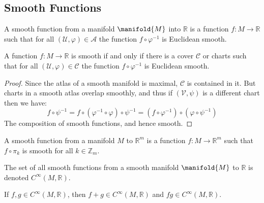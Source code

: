     \subsection{Smooth Functions}
        \begin{definition}
            A smooth function from a manifold $\manifold{M}$ into
            $\mathbb{R}$ is a function $f:M\rightarrow\mathbb{R}$ such that
            for all $(\mathcal{U},\varphi)\in\mathcal{A}$ the function
            $f\circ\varphi^{\minus{1}}$ is Euclidean smooth.
        \end{definition}
        \begin{theorem}
            A function $f:M\rightarrow\mathbb{R}$ is smooth if and only if
            there is a cover $\mathcal{C}$ or charts such that for all
            $(\mathcal{U},\varphi)\in\mathcal{C}$ the function
            $f\circ\varphi^{\minus{1}}$ is Euclidean smooth.
        \end{theorem}
        \begin{proof}
            Since the atlas of a smooth manifold is maximal, $\mathcal{C}$
            is contained in it. But charts in a smooth atlas overlap
            smoothly, and thus if $(\mathcal{V},\psi)$ is a different chart
            then we have:
            \begin{equation}
                f\circ\psi^{\minus{1}}
                    =f\circ(\varphi^{\minus{1}}\circ\varphi)
                        \circ\psi^{\minus{1}}
                    =(f\circ\varphi^{\minus{1}})
                        \circ(\varphi\circ\psi^{\minus{1}})
            \end{equation}
            The composition of smooth functions, and hence smooth.
        \end{proof}
        \begin{definition}
            A smooth function from a manifold $M$ to $\mathbb{R}^{m}$ is a
            function $f:M\rightarrow\mathbb{R}^{m}$ such that
            $f\circ\pi_{k}$ is smooth for all $k\in\mathbb{Z}_{m}$.
        \end{definition}
        \begin{definition}
            The set of all smooth functions from a smooth manifold
            $\manifold{M}$ to $\mathbb{R}$ is denoted
            $C^{\infty}(M,\mathbb{R})$.
        \end{definition}
        \begin{theorem}
            If $f,g\in{C}^{\infty}(M,\mathbb{R})$, then
            $f+g\in{C}^{\infty}(M,\mathbb{R})$ and
            $fg\in{C}^{\infty}(M,\mathbb{R})$.
        \end{theorem}
